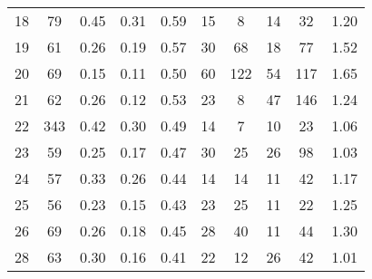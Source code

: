 \begin{tabular}{lccccccccc}
18 &       79 &                             0.45 &                             0.31 &                             0.59 &              15 &               8 &                                 14 &                              32 &       1.20 \\
19 &       61 &                             0.26 &                             0.19 &                             0.57 &              30 &              68 &                                 18 &                              77 &       1.52 \\
20 &       69 &                             0.15 &                             0.11 &                             0.50 &              60 &             122 &                                 54 &                             117 &       1.65 \\
21 &       62 &                             0.26 &                             0.12 &                             0.53 &              23 &               8 &                                 47 &                             146 &       1.24 \\
22 &      343 &                             0.42 &                             0.30 &                             0.49 &              14 &               7 &                                 10 &                              23 &       1.06 \\
23 &       59 &                             0.25 &                             0.17 &                             0.47 &              30 &              25 &                                 26 &                              98 &       1.03 \\
24 &       57 &                             0.33 &                             0.26 &                             0.44 &              14 &              14 &                                 11 &                              42 &       1.17 \\
25 &       56 &                             0.23 &                             0.15 &                             0.43 &              23 &              25 &                                 11 &                              22 &       1.25 \\
26 &       69 &                             0.26 &                             0.18 &                             0.45 &              28 &              40 &                                 11 &                              44 &       1.30 \\
28 &       63 &                             0.30 &                             0.16 &                             0.41 &              22 &              12 &                                 26 &                              42 &       1.01 \\

\end{tabular}

